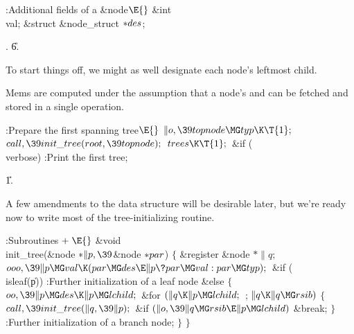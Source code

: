 \Y\B\4:Additional fields of a \&{node}\X${}\E{}$\6
\&{int} \\{val};\6
\&{struct} \&{node\_struct} ${}{*}\\{des}{}$;\par
{}.
\U6.\fi

To start things off, we might as well designate each node's
leftmost child.

Mems are computed under the assumption that a node's  and  can
be fetched and stored in a single operation.

\Y\B\4:Prepare the first spanning tree\X${}\E{}$\6
$\|o,\39\\{topnode}\MG\\{typ}\K\T{1};{}$\6
${}\\{call},\39\\{init\_tree}(\\{root},\39\\{topnode});{}$\6
${}\\{trees}\K\T{1};{}$\6
\&{if} (\\{verbose})\1\5
:Print the first tree\X;\2\par
\U1.\fi

A few amendments to the data structure will be desirable
later, but we're
ready now to write most of the tree-initializing routine.

\Y\B\4:Subroutines\X${}\mathrel+\E{}$\6
\&{void} \\{init\_tree}(\&{node} ${}{*}\|p,\39{}$\&{node} ${}{*}\\{par}{}$)\6
${}\{{}$\1\6
\&{register} \&{node} ${}{*}\|q;{}$\7
${}\\{ooo},\39\|p\MG\\{val}\K(\\{par}\MG\\{des}\E\|p\?\\{par}\MG\\{val}:\\{par}%
\MG\\{typ});{}$\6
\&{if} (\\{isleaf}(\|p))\1\5
:Further initialization of a leaf node\X\2\6
\&{else}\5
${}\{{}$\1\6
${}\\{oo},\39\|p\MG\\{des}\K\|p\MG\\{lchild};{}$\6
\&{for} ${}(\|q\K\|p\MG\\{lchild};{}$  ; ${}\|q\K\|q\MG\\{rsib}){}$\5
${}\{{}$\1\6
${}\\{call},\39\\{init\_tree}(\|q,\39\|p);{}$\6
\&{if} ${}(\|o,\39\|q\MG\\{rsib}\E\|p\MG\\{lchild}){}$\1\5
\&{break};\2\6
\4${}\}{}$\2\6
:Further initialization of a branch node\X;\6
\4${}\}{}$\2\6
\4${}\}{}$\2\par
\fi

